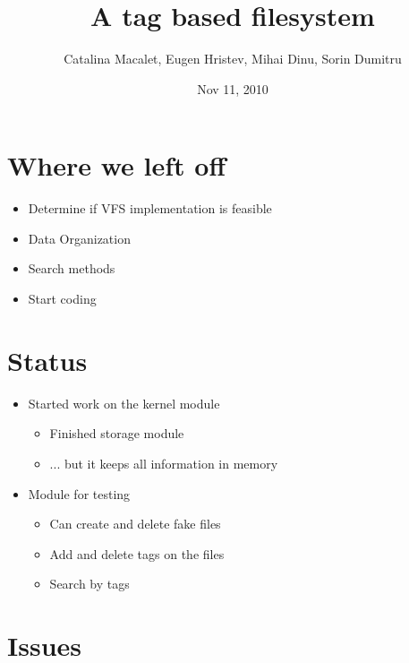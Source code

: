\documentclass{beamer}
\title[TagFS]{A tag based filesystem}
\author{Catalina Macalet, Eugen Hristev, Mihai Dinu, Sorin Dumitru}
\institute{Politehnic University of Bucharest}
\date{Nov 11, 2010}
\begin{document}
\begin{frame}
  \titlepage
\end{frame}

\section{Where we left off}

\begin{frame}
\begin{itemize}
	\item Determine if VFS implementation is feasible
	\item Data Organization
	\item Search methods
	\item Start coding	
\end{itemize}
\end{frame}

\section{Status}

\begin{frame}
\begin{itemize}
	\item Started work on the kernel module
	\begin{itemize}
		\item Finished storage module
		\item ... but it keeps all information in memory
	\end{itemize}
\end{itemize}
\end{frame}

\begin{frame}
\begin{itemize}
	\item Module for testing
	\begin{itemize}
		\item Can create and delete fake files
		\item Add and delete tags on the files
		\item Search by tags
	\end{itemize}
\end{itemize}
\end{frame}

\section{Issues}
\end{document}
